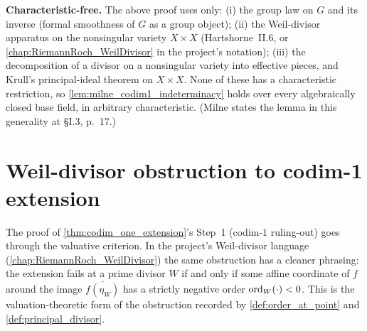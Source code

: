 \begin{remark}
  \label{rmk:milne_lem33_charfree}
  \textbf{Characteristic-free.} The above proof uses only: (i) the group law on \(G\)
  and its inverse (formal smoothness of \(G\) as a group object); (ii) the Weil-divisor
  apparatus on the nonsingular variety \(X \times X\) (Hartshorne~II.6, or
  \cref{chap:RiemannRoch_WeilDivisor} in the project's notation); (iii) the
  decomposition of a divisor on a nonsingular variety into effective pieces, and
  Krull's principal-ideal theorem on \(X \times X\). None of these has a characteristic
  restriction, so \cref{lem:milne_codim1_indeterminacy} holds over every
  algebraically closed base field, in arbitrary characteristic. (Milne states the
  lemma in this generality at \S I.3, p.~17.)
\end{remark}

\section{Weil-divisor obstruction to codim-1 extension}
\label{sec:weil_obstruction}

The proof of \cref{thm:codim_one_extension}'s Step~1 (codim-\(1\) ruling-out) goes
through the valuative criterion. In the project's Weil-divisor language
(\cref{chap:RiemannRoch_WeilDivisor}) the same obstruction has a cleaner phrasing:
the extension fails at a prime divisor \(W\) if and only if some affine coordinate of
\(f\) around the image \(\overline{f(\eta_W)}\) has a strictly negative order
\(\operatorname{ord}_W(\cdot) < 0\). This is the valuation-theoretic form of the obstruction
recorded by \cref{def:order_at_point} and \cref{def:principal_divisor}.

